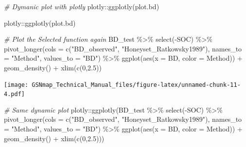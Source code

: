 \documentclass[
  10pt,
  b5paper,
  oneside]{book}
\newenvironment{Shaded}{\begin{snugshade}}{\end{snugshade}}
\newcommand{\AttributeTok}[1]{\textcolor[rgb]{0.77,0.63,0.00}{#1}}
\newcommand{\CommentTok}[1]{\textcolor[rgb]{0.56,0.35,0.01}{\textit{#1}}}
\newcommand{\DecValTok}[1]{\textcolor[rgb]{0.00,0.00,0.81}{#1}}
\newcommand{\FloatTok}[1]{\textcolor[rgb]{0.00,0.00,0.81}{#1}}
\newcommand{\FunctionTok}[1]{\textcolor[rgb]{0.00,0.00,0.00}{#1}}
\newcommand{\NormalTok}[1]{#1}
\newcommand{\SpecialCharTok}[1]{\textcolor[rgb]{0.00,0.00,0.00}{#1}}
\newcommand{\StringTok}[1]{\textcolor[rgb]{0.31,0.60,0.02}{#1}}
\begin{document}
\begin{Shaded}
\begin{Highlighting}[]
\CommentTok{\# Dymanic plot with plotly }
\NormalTok{plotly}\SpecialCharTok{::}\FunctionTok{ggplotly}\NormalTok{(plot.bd)}
\end{Highlighting}
\end{Shaded}

\begin{Shaded}
\begin{Highlighting}[]
\NormalTok{plotly}\SpecialCharTok{::}\FunctionTok{ggplotly}\NormalTok{(plot.bd) }
\end{Highlighting}
\end{Shaded}

\begin{Shaded}
\begin{Highlighting}[]
\CommentTok{\# Plot the Selected function again}
\NormalTok{BD\_test }\SpecialCharTok{\%\textgreater{}\%} 
  \FunctionTok{select}\NormalTok{(}\SpecialCharTok{{-}}\NormalTok{SOC) }\SpecialCharTok{\%\textgreater{}\%} 
  \FunctionTok{pivot\_longer}\NormalTok{(}\AttributeTok{cols =} \FunctionTok{c}\NormalTok{(}\StringTok{"BD\_observed"}\NormalTok{, }\StringTok{"Honeyset\_Ratkowsky1989"}\NormalTok{), }
               \AttributeTok{names\_to =} \StringTok{"Method"}\NormalTok{, }\AttributeTok{values\_to =} \StringTok{"BD"}\NormalTok{) }\SpecialCharTok{\%\textgreater{}\%} 
  \FunctionTok{ggplot}\NormalTok{(}\FunctionTok{aes}\NormalTok{(}\AttributeTok{x =}\NormalTok{ BD, }\AttributeTok{color =}\NormalTok{ Method)) }\SpecialCharTok{+} 
  \FunctionTok{geom\_density}\NormalTok{() }\SpecialCharTok{+} \FunctionTok{xlim}\NormalTok{(}\FunctionTok{c}\NormalTok{(}\DecValTok{0}\NormalTok{,}\FloatTok{2.5}\NormalTok{))}
\end{Highlighting}
\end{Shaded}

\texttt{[image: GSNmap\_Technical\_Manual\_files/figure-latex/unnamed-chunk-11-4.pdf]}

\begin{Shaded}
\begin{Highlighting}[]
\CommentTok{\# Same dynamic plot }
\NormalTok{plotly}\SpecialCharTok{::}\FunctionTok{ggplotly}\NormalTok{(BD\_test }\SpecialCharTok{\%\textgreater{}\%} 
           \FunctionTok{select}\NormalTok{(}\SpecialCharTok{{-}}\NormalTok{SOC) }\SpecialCharTok{\%\textgreater{}\%} 
           \FunctionTok{pivot\_longer}\NormalTok{(}\AttributeTok{cols =} \FunctionTok{c}\NormalTok{(}\StringTok{"BD\_observed"}\NormalTok{, }\StringTok{"Honeyset\_Ratkowsky1989"}\NormalTok{), }
                        \AttributeTok{names\_to =} \StringTok{"Method"}\NormalTok{, }\AttributeTok{values\_to =} \StringTok{"BD"}\NormalTok{) }\SpecialCharTok{\%\textgreater{}\%} 
           \FunctionTok{ggplot}\NormalTok{(}\FunctionTok{aes}\NormalTok{(}\AttributeTok{x =}\NormalTok{ BD, }\AttributeTok{color =}\NormalTok{ Method)) }\SpecialCharTok{+} 
           \FunctionTok{geom\_density}\NormalTok{() }\SpecialCharTok{+} \FunctionTok{xlim}\NormalTok{(}\FunctionTok{c}\NormalTok{(}\DecValTok{0}\NormalTok{,}\FloatTok{2.5}\NormalTok{))) }
\end{Highlighting}
\end{Shaded}
\end{document}
